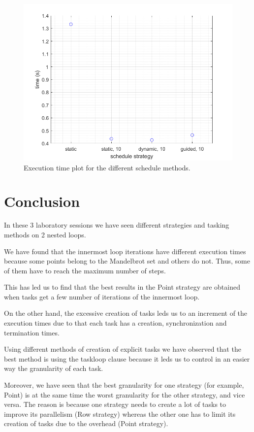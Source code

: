 \documentclass[12pt, a4paper]{article}
\begin{document}
\begin{figure}[H]
  \centering
  \includegraphics[scale=0.5]{./mandel-omp-for-schedule}
  \caption{Execution time plot for the different schedule methods.}
  \label{fig:mandel-omp-for-schedule}
\end{figure}

\newpage

\section{Conclusion}

In these 3 laboratory sessions we have seen different strategies and tasking methods on 2 nested loops.

We have found that the innermost loop iterations have different execution times because some points belong to the Mandelbrot set and others do not. Thus, some of them have to reach the maximum number of steps. 

This has led us to find that the best results in the Point strategy are obtained when tasks get a few number of iterations of the innermost loop.

On the other hand, the excessive creation of tasks leds us to an increment of the execution times due to that each task has a creation, synchronization and termination times.

Using different methods of creation of explicit tasks we have observed that the best method is using the taskloop clause because it leds us to control in an easier way the granularity of each task.

Moreover, we have seen that the best granularity for one strategy (for example, Point) is at the same time the worst granularity for the other strategy, and vice versa. The reason is because one strategy needs to create a lot of tasks to improve its parallelism (Row strategy) whereas the other one has to limit its creation of tasks due to the overhead (Point strategy).
\end{document}
